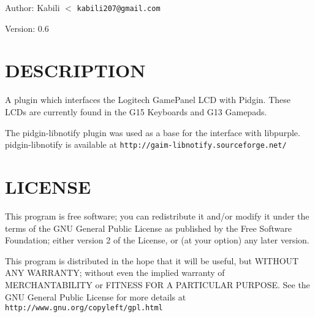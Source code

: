\begin{Desc}
\item[Author:]Kabili $<$ {\tt kabili207@gmail.com} \end{Desc}
\begin{Desc}
\item[Version:]0.6\end{Desc}
\section{DESCRIPTION}\label{main_DESCRIPTION}
A plugin which interfaces the Logitech GamePanel LCD with Pidgin. These LCDs are currently found in the G15 Keyboards and G13 Gamepads.

The pidgin-libnotify plugin was used as a base for the interface with libpurple. pidgin-libnotify is available at {\tt http://gaim-libnotify.sourceforge.net/}\section{LICENSE}\label{main_LICENSE}
This program is free software; you can redistribute it and/or modify it under the terms of the GNU General Public License as published by the Free Software Foundation; either version 2 of the License, or (at your option) any later version.

This program is distributed in the hope that it will be useful, but WITHOUT ANY WARRANTY; without even the implied warranty of MERCHANTABILITY or FITNESS FOR A PARTICULAR PURPOSE. See the GNU General Public License for more details at {\tt http://www.gnu.org/copyleft/gpl.html} 